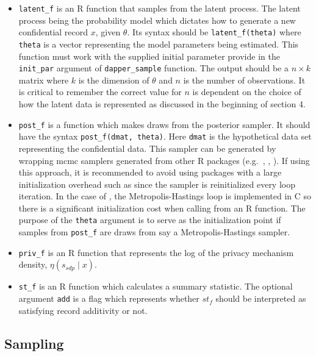 \begin{itemize}
\item
  \texttt{latent\_f} is an R function that samples from the latent process.
  The latent process being the probability model which dictates how
  to generate a new confidential record \(x\), given \(\theta\).
  Its syntax should be \texttt{latent\_f(theta)} where \texttt{theta} is a vector
  representing the model parameters being estimated. This function
  must work with the supplied initial parameter provide in the \texttt{init\_par}
  argument of \texttt{dapper\_sample} function. The output should be a \(n \times k\) matrix
  where \(k\) is the dimension of \(\theta\) and \(n\) is the number of observations. It is
  critical to remember the correct value for \(n\) is dependent on the choice of how the latent data is
  represented as discussed in the beginning of section 4.
\item
  \texttt{post\_f} is a function which makes draws from the posterior sampler. It should
  have the syntax \texttt{post\_f(dmat,\ theta)}. Here \texttt{dmat} is the
  hypothetical data set representing the confidential data. This sampler can be generated by wrapping mcmc samplers generated from other R packages
  (e.g.~, , ).
  If using this approach, it is recommended to avoid using packages
  with a large initialization overhead such as  since the sampler is reinitialized
  every loop iteration. In the case of ,
  the Metropolis-Hastings loop is implemented in C so there is a significant initialization cost
  when calling from an R function. The purpose of the \texttt{theta} argument is
  to serve as the initialization point if samples from \texttt{post\_f} are draws
  from say a Metropolis-Hastings sampler.
\item
  \texttt{priv\_f} is an R function that represents the log of the privacy mechanism density, \(\eta(s_{sdp} \mid x)\).
\item
  \texttt{st\_f} is an R function which calculates a summary statistic. The optional
  argument \texttt{add} is a flag which represents whether \(st_f\) should be interpreted as
  satisfying record additivity or not.
\end{itemize}

\hypertarget{sampling}{%
\subsection{Sampling}\label{sampling}}

